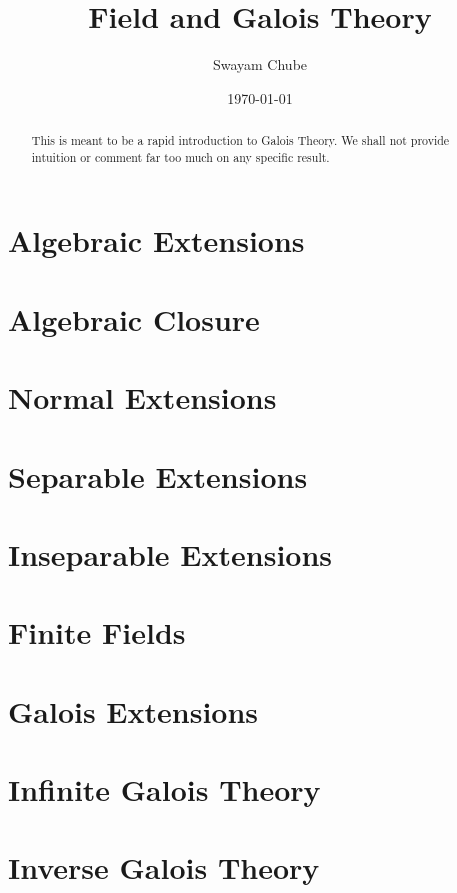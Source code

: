 \documentclass[11pt]{report}
\title{Field and Galois Theory}
\author{Swayam Chube}
\date{\today}
\begin{document}
\maketitle

\begin{abstract}
    This is meant to be a rapid introduction to Galois Theory. We shall not provide intuition or comment far too much on any specific result.
\end{abstract}

\tableofcontents

\newpage

\chapter{Algebraic Extensions}
 

\newpage

\chapter{Algebraic Closure}


\newpage

\chapter{Normal Extensions}


\newpage

\chapter{Separable Extensions}


\newpage 

\chapter{Inseparable Extensions}


\newpage

\chapter{Finite Fields}


\newpage 

\chapter{Galois Extensions}


\chapter{Infinite Galois Theory}


\chapter{Inverse Galois Theory}

\end{document}

